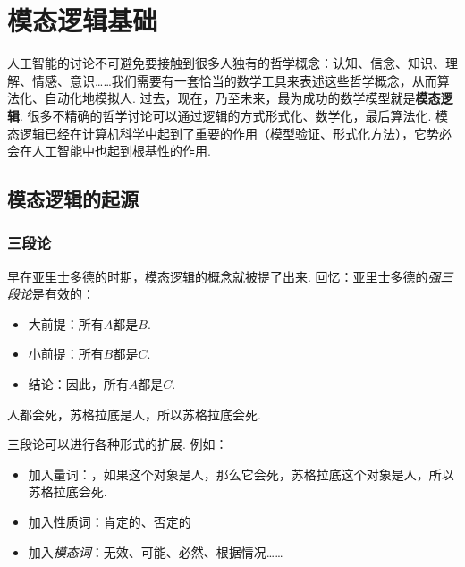 \chapter{模态逻辑基础}\label{chap:modal-logic}

\begingroup
\newcommand{\pref}{Chapters/modal-logic/figures}

 人工智能的讨论不可避免要接触到很多人独有的哲学概念：认知、信念、知识、理解、情感、意识……我们需要有一套恰当的数学工具来表述这些哲学概念，从而算法化、自动化地模拟人. 过去，现在，乃至未来，最为成功的数学模型就是\textbf{模态逻辑}. 很多不精确的哲学讨论可以通过逻辑的方式形式化、数学化，最后算法化. 模态逻辑已经在计算机科学中起到了重要的作用（模型验证、形式化方法），它势必会在人工智能中也起到根基性的作用.
    
\section{模态逻辑的起源}
\subsection{三段论}

早在亚里士多德的时期，模态逻辑的概念就被提了出来. 回忆：亚里士多德的\emph{强三段论}是有效的：
\begin{itemize}
    \item 大前提：所有$A$都是$B$.
    \item 小前提：所有$B$都是$C$.
    \item 结论：因此，所有$A$都是$C$.
\end{itemize}
人都会死，苏格拉底是人，所以苏格拉底会死.

三段论可以进行各种形式的扩展. 例如：
\begin{itemize}
    \item 加入量词：，如果这个对象是人，那么它会死，苏格拉底这个对象是人，所以苏格拉底会死.
    \item 加入性质词：肯定的、否定的
    \item 加入\emph{模态词}：无效、可能、必然、根据情况……
\end{itemize}
    
